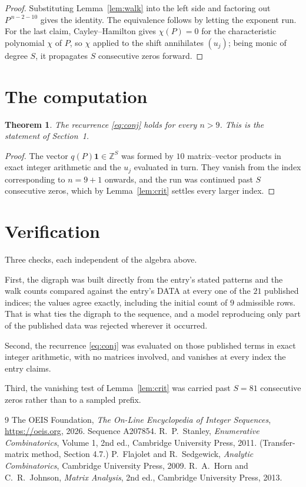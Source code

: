 \documentclass[11pt,a4paper]{article}
\theoremstyle{plain}
\newtheorem{theorem}{Theorem}
\theoremstyle{definition}
\begin{document}
\begin{proof}
Substituting Lemma~\ref{lem:walk} into the left side and factoring out
$P^{\,n-2-10}$ gives the identity. The equivalence follows by letting the exponent
run. For the last claim, Cayley--Hamilton gives $\chi(P)=0$ for the characteristic
polynomial $\chi$ of $P$, so $\chi$ applied to the shift annihilates $(u_j)$; being monic of
degree $S$, it propagates $S$ consecutive zeros forward.
\end{proof}

\section{The computation}

\begin{theorem}
The recurrence \eqref{eq:conj} holds for every $n>9$. This is the statement of
Section~1.
\end{theorem}

\begin{proof}
The vector $q(P)\mathbf{1}\in\mathbb{Z}^{S}$ was formed by $10$ matrix--vector
products in exact integer arithmetic and the $u_j$ evaluated in turn. They vanish from the
index corresponding to $n=9+1$ onwards, and the run was continued past $S$ consecutive
zeros, which by Lemma~\ref{lem:crit} settles every larger index.
\end{proof}

\section{Verification}

Three checks, each independent of the algebra above.

First, the digraph was built directly from the entry's stated patterns and the walk counts
compared against the entry's DATA at every one of the $21$ published indices; the
values agree exactly, including the initial count of $9$ admissible rows. That is
what ties the digraph to the sequence, and a model reproducing only part of the published
data was rejected wherever it occurred.

Second, the recurrence \eqref{eq:conj} was evaluated on those published terms in exact
integer arithmetic, with no matrices involved, and vanishes at every index the entry claims.

Third, the vanishing test of Lemma~\ref{lem:crit} was carried past $S=81$ consecutive
zeros rather than to a sampled prefix.

\begin{thebibliography}{9}
 The OEIS Foundation, \emph{The On-Line Encyclopedia of Integer
Sequences}, \url{https://oeis.org}, 2026. Sequence A207854.
 R.~P.~Stanley, \emph{Enumerative Combinatorics}, Volume 1, 2nd ed.,
Cambridge University Press, 2011. (Transfer-matrix method, Section 4.7.)
 P.~Flajolet and R.~Sedgewick, \emph{Analytic Combinatorics}, Cambridge
University Press, 2009.
 R.~A.~Horn and C.~R.~Johnson, \emph{Matrix Analysis}, 2nd ed., Cambridge
University Press, 2013.
\end{thebibliography}
\end{document}
